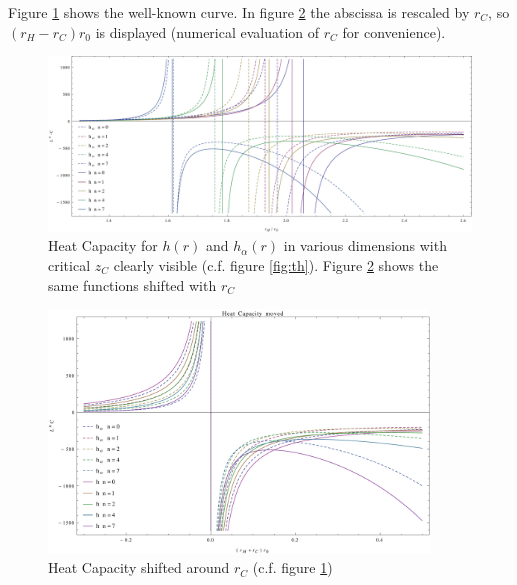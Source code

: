 \documentclass[10pt,a4paper, fleqn]{article}
\begin{document}
Figure \ref{fig:heat1} shows the well-known curve. In figure \ref{fig:heat0} the abscissa is rescaled by $r_C$, so $(r_H-r_C)r_0$ is displayed (numerical evaluation of $r_C$ for convenience).

\begin{figure}
\includegraphics[width=\textwidth]{mathematica/th-holo-nicer.pdf}
\caption{Heat Capacity for $h(r)$ and $h_\alpha(r)$ in various dimensions with critical $z_C$ clearly visible (c.f. figure \ref{fig:th}). Figure \ref{fig:heat0} shows the same functions shifted with $r_C$} \label{fig:heat1}
\end{figure}

\begin{figure}
\includegraphics[width=0.9\textwidth]{mathematica/heat-capacity-rC.pdf}
\caption{Heat Capacity shifted around $r_C$ (c.f. figure \ref{fig:heat1})}\label{fig:heat0}
\end{figure}
\end{document}
